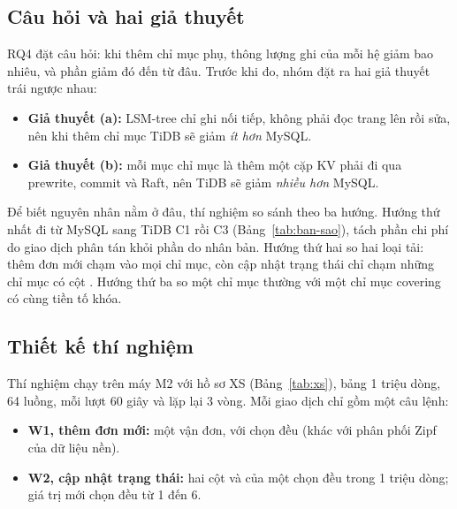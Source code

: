 
\subsection{Câu hỏi và hai giả thuyết}

RQ4 đặt câu hỏi: khi thêm chỉ mục phụ, thông lượng ghi của mỗi hệ giảm bao nhiêu, và phần giảm đó đến từ đâu. Trước khi đo, nhóm đặt ra hai giả thuyết trái ngược nhau:

\begin{itemize}
  \item \textbf{Giả thuyết (a):} LSM-tree chỉ ghi nối tiếp, không phải đọc trang lên rồi sửa, nên khi thêm chỉ mục TiDB sẽ giảm \emph{ít hơn} MySQL.
  \item \textbf{Giả thuyết (b):} mỗi mục chỉ mục là thêm một cặp KV phải đi qua prewrite, commit và Raft, nên TiDB sẽ giảm \emph{nhiều hơn} MySQL.
\end{itemize}

Để biết nguyên nhân nằm ở đâu, thí nghiệm so sánh theo ba hướng. Hướng thứ nhất đi từ MySQL sang TiDB C1 rồi C3 (Bảng~\ref{tab:ban-sao}), tách phần chi phí do giao dịch phân tán khỏi phần do nhân bản. Hướng thứ hai so hai loại tải: thêm đơn mới chạm vào mọi chỉ mục, còn cập nhật trạng thái chỉ chạm những chỉ mục có cột . Hướng thứ ba so một chỉ mục thường với một chỉ mục covering có cùng tiền tố khóa.

\subsection{Thiết kế thí nghiệm}

Thí nghiệm chạy trên máy M2 với hồ sơ XS (Bảng~\ref{tab:xs}), bảng 1 triệu dòng, 64 luồng, mỗi lượt 60 giây và lặp lại 3 vòng. Mỗi giao dịch chỉ gồm một câu lệnh:

\begin{itemize}
  \item \textbf{W1, thêm đơn mới:}  một vận đơn, với  chọn đều (khác với phân phối Zipf của dữ liệu nền).
  \item \textbf{W2, cập nhật trạng thái:}  hai cột  và  của một  chọn đều trong 1 triệu dòng; giá trị  mới chọn đều từ 1 đến 6.
\end{itemize}

